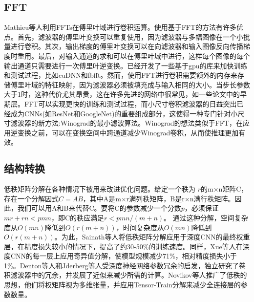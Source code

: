 \documentclass[final]{cvpr}
\begin{document}
\subsection{FFT}
Mathieu等人利用FFTs在傅里叶域进行卷积运算。使用基于FFT的方法有许多优点。首先，滤波器的傅里叶变换可以重复使用，因为滤波器与多幅图像在一个小批量进行卷积。其次，输出梯度的傅里叶变换可以在向滤波器和输入图像反向传播梯度时重用。最后，对输入通道的求和可以在傅里叶域中进行，这样每个图像的每个输出通道只需要进行一次傅里叶逆变换。已经开发了一些基于gpu的库来加快训练和测试过程，比如cuDNN和fbfft。然而，使用FFT进行卷积需要额外的内存来存储傅里叶域的特征映射，因为滤波器必须被填充成与输入相同的大小。当步长参数大于1时，这种代价尤其昂贵，这在许多先进的网络中很常见，如一些论文中的早期层。FFT可以实现更快的训练和测试过程，而小尺寸卷积滤波器的日益突出已经成为CNNs(如ResNet和GoogleNet)的重要组成部分，这使得一种专门针对小尺寸滤波器的新方法:Winograd的最小滤波算法。Winograd的想法类似于FFT，在应用逆变换之前，可以在变换空间中跨通道减少Winograd卷积，从而使推理更加有效。
\subsection{结构转换}
低秩矩阵分解在各种情况下被用来改进优化问题。给定一个秩为 $r$的m×n矩阵C，存在一个分解因式$C = AB$，其中A是m×r满列秩矩阵，B是r×n满行秩矩阵。因此，我们可以用A和B来代替C。要将C的参数减少一个分数$p$，必须保证$mr+rn < pmn$，即C的秩应满足$r < pmn/(m + n)$。
通过这种分解，空间复杂度从$O(mn)$降低到$O(r(m + n))$，时间复杂度从$O(mn)$降低到$O(r(m + n))$。为此，Sainath等人将低秩矩阵分解应用于深度CNN的最终权重层，在精度损失较小的情况下，提高了约30-50\%的训练速度。同样，Xue等人在深度CNN的每一层上应用奇异值分解，使模型规模减少71\%，相对精度损失小于1\%。Denton等人和Jderberg等人受深度神经网络参数冗余的启发，独立研究了卷积滤波器中的冗余，并发展了近似来减少所需的计算。Novikov等人推广了低秩的思想，他们将权矩阵视为多维张量，并应用Tensor-Train分解来减少全连接层的参数数量。



{\small


}

\end{document}
